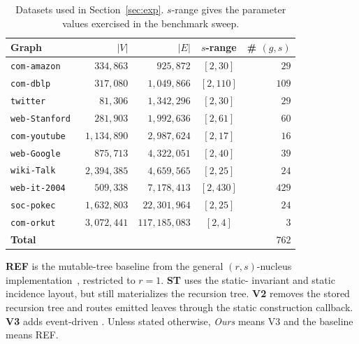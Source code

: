 \begin{table}[t]
\centering
\caption{Datasets used in Section~\ref{sec:exp}. \(s\)-range gives the parameter values exercised in the benchmark sweep.}
\label{tab:datasets}
\small
\begin{tabular}{lrrcr}
\toprule
Graph & \(|V|\) & \(|E|\) & \(s\)-range & \# \((g,s)\) \\
\midrule
\texttt{com-amazon}~\cite{communityFinder}      & \(334{,}863\)    & \(925{,}872\)       & \([2,30]\)  & \(29\) \\
\texttt{com-dblp}~\cite{communityFinder}        & \(317{,}080\)    & \(1{,}049{,}866\)   & \([2,110]\) & \(109\) \\
\texttt{twitter}~\cite{communityFinder}         & \(\phantom{0,0}81{,}306\) & \(1{,}342{,}296\) & \([2,30]\) & \(29\) \\
\texttt{web-Stanford}~\cite{communityFinder}    & \(281{,}903\)    & \(1{,}992{,}636\)   & \([2,61]\)  & \(60\) \\
\texttt{com-youtube}~\cite{communityFinder}     & \(1{,}134{,}890\) & \(2{,}987{,}624\)   & \([2,17]\)  & \(16\) \\
\texttt{web-Google}~\cite{communityFinder}      & \(875{,}713\)    & \(4{,}322{,}051\)   & \([2,40]\)  & \(39\) \\
\texttt{wiki-Talk}~\cite{communityFinder}       & \(2{,}394{,}385\) & \(4{,}659{,}565\)   & \([2,25]\)  & \(24\) \\
\texttt{web-it-2004}~\cite{communityFinder}     & \(509{,}338\)    & \(7{,}178{,}413\)   & \([2,430]\) & \(429\) \\
\texttt{soc-pokec}~\cite{communityFinder}       & \(1{,}632{,}803\) & \(22{,}301{,}964\)  & \([2,25]\)  & \(24\) \\
\texttt{com-orkut}~\cite{communityFinder}       & \(3{,}072{,}441\) & \(117{,}185{,}083\) & \([2,4]\)   & \(3\) \\
\midrule
\textbf{Total} & & & & \(762\) \\
\bottomrule
\end{tabular}
\end{table}

\textbf{REF} is the mutable-tree baseline from the general \((r,s)\)-nucleus implementation~\cite{NuclearCD}, restricted to \(r=1\).
%
\textbf{ST} uses the static-\cpi{} invariant and static incidence layout, but still materializes the recursion tree.
%
\textbf{V2} removes the stored recursion tree and routes emitted leaves through the static construction callback.
%
\textbf{V3} adds event-driven \peelH{}.
%
Unless stated otherwise, \emph{Ours} means V3 and the baseline means REF.

